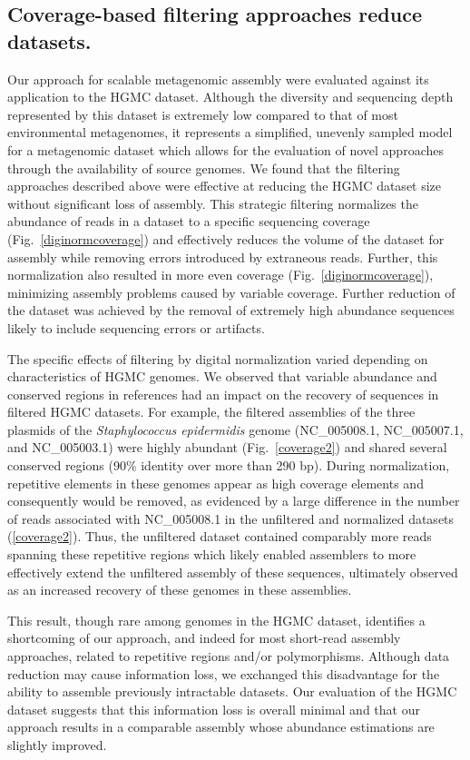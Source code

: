 \documentclass{pnastwo}
\begin{document}
\begin{article}
\subsection*{Coverage-based filtering approaches reduce datasets.} 
Our approach for scalable metagenomic assembly
were evaluated against its application to the HGMC dataset. Although the
diversity and sequencing depth represented by this dataset is extremely low
compared to that of most environmental metagenomes, it represents a simplified,
unevenly sampled model for a metagenomic dataset which allows for the evaluation
of novel approaches through the availability of source genomes. We found that
the filtering approaches described above were effective at reducing the HGMC
dataset size without significant loss of assembly. This strategic filtering
normalizes the abundance of reads in a dataset to a specific sequencing coverage
(Fig.~\ref{diginormcoverage}) and effectively reduces the volume of the dataset for assembly while
removing errors introduced by extraneous reads. Further, this normalization also
resulted in more even coverage (Fig.~\ref{diginormcoverage}), minimizing
assembly problems caused by variable coverage. Further reduction of the dataset
was achieved by the removal of extremely high abundance sequences likely to include
sequencing errors or artifacts.

The specific effects of filtering by digital normalization varied depending on
characteristics of HGMC genomes. We observed that variable abundance and
conserved regions in references had an impact on the recovery of sequences in
filtered HGMC datasets. For example, the filtered assemblies of the three
plasmids of the \emph{Staphylococcus epidermidis} genome (NC\_005008.1,
NC\_005007.1, and NC\_005003.1) were highly abundant (Fig.~\ref{coverage2}) and shared
several conserved regions (90\% identity over more than 290 bp). During
normalization, repetitive elements in these genomes appear as high coverage
elements and consequently would be removed, as evidenced by a large difference
in the number of reads associated with NC\_005008.1 in the unfiltered and
normalized datasets (\ref{coverage2}). Thus, the unfiltered dataset
contained comparably more reads spanning these repetitive regions which likely
enabled assemblers to more effectively extend the unfiltered assembly of these
sequences, ultimately observed as an increased recovery of these genomes in
these assemblies.

This result, though rare among genomes in the HGMC dataset, identifies a
shortcoming of our approach, and indeed for most short-read assembly approaches,
related to repetitive regions and/or polymorphisms. Although data reduction may
cause information loss, we exchanged this disadvantage for the ability to
assemble previously intractable datasets. Our evaluation of the HGMC dataset
suggests that this information loss is overall minimal and that our approach
results in a comparable assembly whose abundance estimations are slightly
improved.


\end{article}
\end{document}

